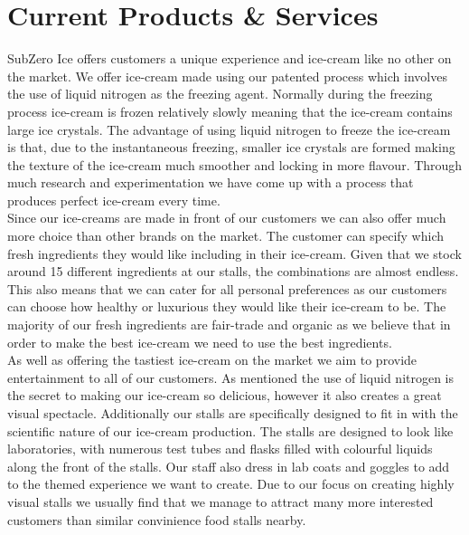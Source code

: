 \documentclass{article}
\begin{document}
\section{Current Products \& Services}

  SubZero Ice offers customers a unique experience and ice-cream like no other on the market. We offer ice-cream made using our patented process which involves the use of liquid nitrogen as the freezing agent. Normally during the freezing process ice-cream is frozen relatively slowly meaning that the ice-cream contains large ice crystals. The advantage of using liquid nitrogen to freeze the ice-cream is that, due to the instantaneous freezing, smaller ice crystals are formed making the texture of the ice-cream much smoother and locking in more flavour. Through much research and experimentation we have come up with a process that produces perfect ice-cream every time. \\

  Since our ice-creams are made in front of our customers we can also offer much more choice than other brands on the market. The customer can specify which fresh ingredients they would like including in their ice-cream. Given that we stock around 15 different ingredients at our stalls, the combinations are almost endless. This also means that we can cater for all personal preferences as our customers can choose how healthy or luxurious they would like their ice-cream to be. The majority of our fresh ingredients are fair-trade and organic as we believe that in order to make the best ice-cream we need to use the best ingredients. \\

  As well as offering the tastiest ice-cream on the market we aim to provide entertainment to all of our customers. As mentioned the use of liquid nitrogen is the secret to making our ice-cream so delicious, however it also creates a great visual spectacle. Additionally our stalls are specifically designed to fit in with the scientific nature of our ice-cream production. The stalls are designed to look like laboratories, with numerous test tubes and flasks filled with colourful liquids along the front of the stalls. Our staff also dress in lab coats and goggles to add to the themed experience we want to create. Due to our focus on creating highly visual stalls we usually find that we manage to attract many more interested customers than similar convinience food stalls nearby. \\
  
\end{document}

